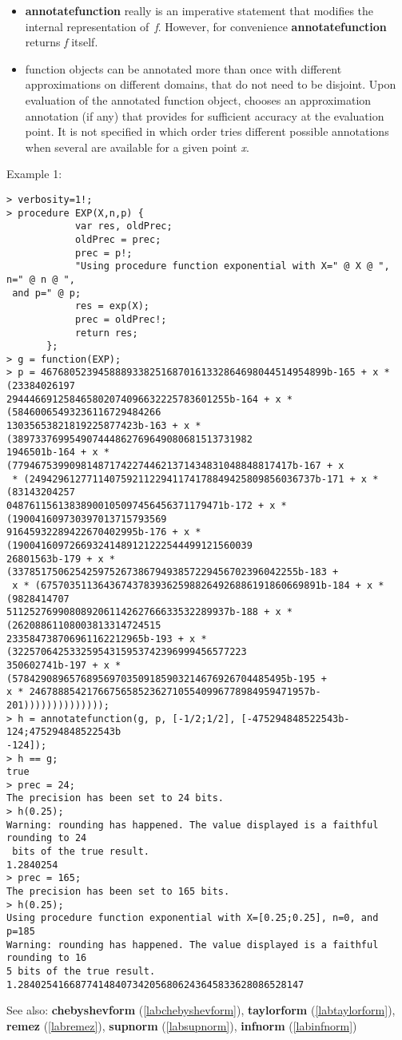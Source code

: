\begin{itemize}
\item \textbf{annotatefunction} really is an imperative statement that modifies the
   internal representation of~\emph{f}. However, for convenience \textbf{annotatefunction}
   returns \emph{f} itself.

\item \sollya function objects can be annotated more than once with different
   approximations on different domains, that do not need to be disjoint. Upon
   evaluation of the annotated function object, \sollya chooses an
   approximation annotation (if any) that provides for sufficient accuracy at
   the evaluation point. It is not specified in which order \sollya tries
   different possible annotations when several are available for a given
   point \emph{x}.
\end{itemize}
\noindent Example 1: 
\begin{center}\begin{minipage}{15cm}\begin{Verbatim}[frame=single]
> verbosity=1!;
> procedure EXP(X,n,p) {
            var res, oldPrec;
            oldPrec = prec;
            prec = p!;
            "Using procedure function exponential with X=" @ X @ ", n=" @ n @ ",
 and p=" @ p;
            res = exp(X);
            prec = oldPrec!;
            return res;
       };
> g = function(EXP);
> p = 46768052394588893382516870161332864698044514954899b-165 + x * (23384026197
294446691258465802074096632225783601255b-164 + x * (58460065493236116729484266
13035653821819225877423b-163 + x * (389733769954907444862769649080681513731982
1946501b-164 + x * (7794675399098148717422744621371434831048848817417b-167 + x
 * (24942961277114075921122941174178849425809856036737b-171 + x * (83143204257
04876115613838900105097456456371179471b-172 + x * (190041609730397013715793569
91645932289422670402995b-176 + x * (190041609726693241489121222544499121560039
26801563b-179 + x * (33785175062542597526738679493857229456702396042255b-183 +
 x * (6757035113643674378393625988264926886191860669891b-184 + x * (9828414707
511252769908089206114262766633532289937b-188 + x * (26208861108003813314724515
233584738706961162212965b-193 + x * (32257064253325954315953742396999456577223
350602741b-197 + x * (578429089657689569703509185903214676926704485495b-195 + 
x * 2467888542176675658523627105540996778984959471957b-201))))))))))))));
> h = annotatefunction(g, p, [-1/2;1/2], [-475294848522543b-124;475294848522543b
-124]);
> h == g;
true
> prec = 24;
The precision has been set to 24 bits.
> h(0.25);
Warning: rounding has happened. The value displayed is a faithful rounding to 24
 bits of the true result.
1.2840254
> prec = 165;
The precision has been set to 165 bits.
> h(0.25);
Using procedure function exponential with X=[0.25;0.25], n=0, and p=185
Warning: rounding has happened. The value displayed is a faithful rounding to 16
5 bits of the true result.
1.28402541668774148407342056806243645833628086528147
\end{Verbatim}
\end{minipage}\end{center}
See also: \textbf{chebyshevform} (\ref{labchebyshevform}), \textbf{taylorform} (\ref{labtaylorform}), \textbf{remez} (\ref{labremez}), \textbf{supnorm} (\ref{labsupnorm}), \textbf{infnorm} (\ref{labinfnorm})
